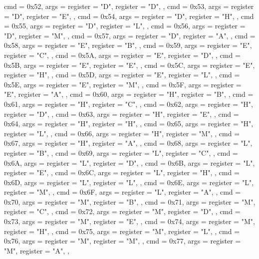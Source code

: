 {{        { cmd = 0x52, args = {{register = "D"}, {register = "D"}}, },
        { cmd = 0x53, args = {{register = "D"}, {register = "E"}}, },
        { cmd = 0x54, args = {{register = "D"}, {register = "H"}}, },
        { cmd = 0x55, args = {{register = "D"}, {register = "L"}}, },
        { cmd = 0x56, args = {{register = "D"}, {register = "M"}}, },
        { cmd = 0x57, args = {{register = "D"}, {register = "A"}}, },
        { cmd = 0x58, args = {{register = "E"}, {register = "B"}}, },
        { cmd = 0x59, args = {{register = "E"}, {register = "C"}}, },
        { cmd = 0x5A, args = {{register = "E"}, {register = "D"}}, },
        { cmd = 0x5B, args = {{register = "E"}, {register = "E"}}, },
        { cmd = 0x5C, args = {{register = "E"}, {register = "H"}}, },
        { cmd = 0x5D, args = {{register = "E"}, {register = "L"}}, },
        { cmd = 0x5E, args = {{register = "E"}, {register = "M"}}, },
        { cmd = 0x5F, args = {{register = "E"}, {register = "A"}}, },
        { cmd = 0x60, args = {{register = "H"}, {register = "B"}}, },
        { cmd = 0x61, args = {{register = "H"}, {register = "C"}}, },
        { cmd = 0x62, args = {{register = "H"}, {register = "D"}}, },
        { cmd = 0x63, args = {{register = "H"}, {register = "E"}}, },
        { cmd = 0x64, args = {{register = "H"}, {register = "H"}}, },
        { cmd = 0x65, args = {{register = "H"}, {register = "L"}}, },
        { cmd = 0x66, args = {{register = "H"}, {register = "M"}}, },
        { cmd = 0x67, args = {{register = "H"}, {register = "A"}}, },
        { cmd = 0x68, args = {{register = "L"}, {register = "B"}}, },
        { cmd = 0x69, args = {{register = "L"}, {register = "C"}}, },
        { cmd = 0x6A, args = {{register = "L"}, {register = "D"}}, },
        { cmd = 0x6B, args = {{register = "L"}, {register = "E"}}, },
        { cmd = 0x6C, args = {{register = "L"}, {register = "H"}}, },
        { cmd = 0x6D, args = {{register = "L"}, {register = "L"}}, },
        { cmd = 0x6E, args = {{register = "L"}, {register = "M"}}, },
        { cmd = 0x6F, args = {{register = "L"}, {register = "A"}}, },
        { cmd = 0x70, args = {{register = "M"}, {register = "B"}}, },
        { cmd = 0x71, args = {{register = "M"}, {register = "C"}}, },
        { cmd = 0x72, args = {{register = "M"}, {register = "D"}}, },
        { cmd = 0x73, args = {{register = "M"}, {register = "E"}}, },
        { cmd = 0x74, args = {{register = "M"}, {register = "H"}}, },
        { cmd = 0x75, args = {{register = "M"}, {register = "L"}}, },
        { cmd = 0x76, args = {{register = "M"}, {register = "M"}}, },
        { cmd = 0x77, args = {{register = "M"}, {register = "A"}}, },
}}
